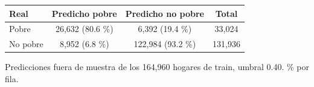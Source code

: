 
\begin{threeparttable}
\begin{tabular}[t]{lccc}
\toprule
Real & Predicho pobre & Predicho no pobre & Total\\
\midrule
Pobre & 26,632 (80.6 \%) & 6,392 (19.4 \%) & 33,024\\
No pobre & 8,952 (6.8 \%) & 122,984 (93.2 \%) & 131,936\\
\bottomrule
\end{tabular}
\begin{tablenotes}
\item Predicciones fuera de muestra de los 164,960 hogares de train, umbral 0.40. \% por fila.
\end{tablenotes}
\end{threeparttable}
